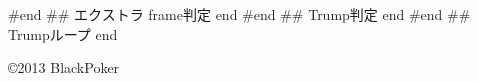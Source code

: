 \documentclass[twocolumn,a5paper,papersize,10pt]{jarticle}
\begin{document}
#end ## エクストラ frame判定 end
#end ## Trump判定 end
#end ## Trumpループ end

\thispagestyle{empty}
\begin{flushright}
\begin{minipage}{0.8\hsize}
\end{minipage}
\end{flushright}

\begin{flushright}
\copyright 2013 BlackPoker
\end{flushright}
\end{document}

